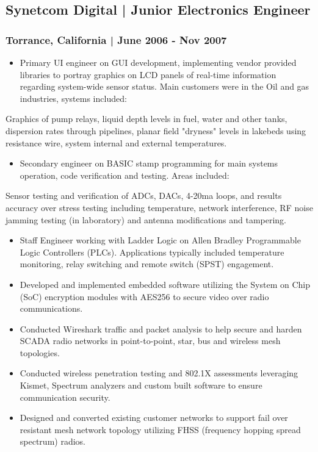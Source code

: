 \documentclass[letter,10pt]{article}
\begin{document}
\subsection*{Synetcom Digital | Junior Electronics Engineer}
\label{sec:orgb88d773}
\subsubsection*{Torrance, California | June 2006 - Nov 2007}
\label{sec:orge792bc9}
\begin{itemize}
\item Primary UI engineer on GUI development, implementing vendor provided libraries to portray graphics on LCD panels of real-time information regarding system-wide sensor status. Main customers were in the Oil and gas industries, systems included:
\end{itemize}
Graphics of pump relays, liquid depth levels in fuel, water and other tanks, dispersion rates through pipelines, planar field "dryness" levels in lakebeds using resistance wire, system internal and external temperatures.
\begin{itemize}
\item Secondary engineer on BASIC stamp programming for main systems operation, code verification and testing. Areas included:
\end{itemize}
Sensor testing and verification of ADCs, DACs, 4-20ma loops, and results accuracy over stress testing including temperature, network interference, RF noise jamming testing (in laboratory) and antenna modifications and tampering.
\begin{itemize}
\item Staff Engineer working with Ladder Logic on Allen Bradley Programmable Logic Controllers (PLCs). Applications typically included temperature monitoring, relay switching and remote switch (SPST) engagement.
\item Developed and implemented embedded software utilizing the System on Chip (SoC) encryption modules with AES256 to secure video over radio communications.
\item Conducted Wireshark traffic and packet analysis to help secure and harden SCADA radio networks in point-to-point, star, bus and wireless mesh topologies.
\item Conducted wireless penetration testing and 802.1X assessments leveraging Kismet, Spectrum analyzers and custom built software to ensure communication security.
\item Designed and converted existing customer networks to support fail over resistant mesh network topology utilizing FHSS (frequency hopping spread spectrum) radios.
\end{itemize}
\end{document}
